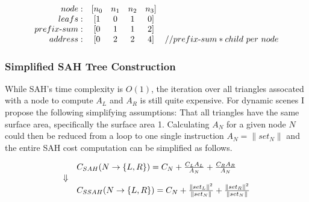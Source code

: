\begin{displaymath}
  \begin{array}{r c c c c l}
    node: & [n_0 & n_1 & n_2 & n_3]\\
    leafs: & [1 & 0 & 1 & 0]\\
    prefix\text{-}sum: & [0 & 1 & 1 & 2]\\
    address: & [0 & 2 & 2 & 4] & // prefix\text{-}sum * child\text{ }per\text{ } node\\
  \end{array}
\end{displaymath}



\subsubsection{Simplified SAH Tree Construction}


While SAH's time complexity is $O(1)$, the iteration over all triangles
assocated with a node to compute $A_L$ and $A_R$ is still quite expensive. For
dynamic scenes I propose the following simplifying assumptions: That all
triangles have the same surface area, specifically the surface area
1. Calculating $A_N$ for a given node $N$ could then be reduced from a loop to
one single instruction $A_N = \|set_N\|$ and the entire SAH cost computation can
be simplified as follows.

\begin{displaymath}
  \begin{array}{r l}
    & C_{SAH}(N \rightarrow \{L, R\}) = C_N + \frac{C_L A_L}{A_N} + \frac{C_R
      A_R}{A_N}\\
    \Downarrow \\
    & C_{SSAH}(N \rightarrow \{L, R\}) = C_N +
    \frac{\|set_L\|^2}{\|set_N\|} + \frac{\|set_R\|^2}{\|set_N\|}\\
  \end{array}
\end{displaymath}


